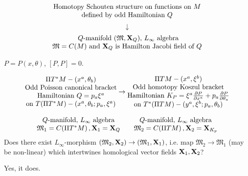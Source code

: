 \documentclass{beamer}
\def\p{\partial}
\def\M {{\mathfrak M}}
\def\p {\partial}
\def \X   {{\bf X}}
\begin{document}
\begin{frame}
           $$
          \begin{matrix}
\hbox
 {Homotopy Schouten structure on functions on $M$}\cr
       \hbox{defined by odd Hamiltonian $Q$}\cr
          \end{matrix}
          $$
          $$
         \downarrow
          $$
         $$
       \begin{matrix}
  \hbox{ $Q$-manifold $(\M, \X_Q)$, $L_\infty$ algebra}\cr
 \hbox{$\M=C(M)$ and $\X_Q$ is Hamilton Jacobi field of $Q$}\cr
       \end{matrix}
         $$



\end{frame}
\begin{frame}

\centerline {$P=P(x,\theta)$, $[P,P]=0$.}

                 $$
              \begin{matrix}
                     \Pi T^*M-(x^a,\theta_b)\cr
 \hbox {Odd Poisson canonical bracket}\cr
   \hbox {Hamiltonian $Q=p_a\xi^a$}\cr
        \hbox{on $T(\Pi T^*M)-(x^a,\theta_b; p_a,\xi ^a)$}
                \end{matrix}
                      \rightarrow
                     \begin{matrix}
                     \Pi TM-(x^a,\xi^b)\cr
    \hbox{Odd homotopy Koszul bracket}\cr
    \hbox{Hamiltonian $K_P=\xi^a{\p P\over \p x^a}+
         p_a{\p P\over \p \theta_a}$}\cr
\hbox{on $T^*(\Pi TM)-(y^a,\xi^b; p_a,\theta_b)$}   
                \end{matrix}
                 $$

   

      $$
      \begin{matrix}
      \hbox{$Q$-manifold, $L_\infty$ algebra}\cr
  \M_1=C(\Pi T^*M)\,, \X_1=\X_Q\cr
             \end{matrix}
           \qquad
            \begin{matrix}
      \hbox{$Q$-manifold, $L_\infty$ algebra}\cr
      \M_2=C(\Pi TM)\,, \X_2=\X_{K_p}\cr
                 \end{matrix}
         $$
Does there exist $L_\infty$-morphism $(\M_2,\X_2)\to (\M_1,\X_1)$, i.e.
map $\M_2\to \M_1$ (may be non-linear)
which intertwines homological vector fields $\X_1,\X_2$?

\begin{theorem}
   Yes, it does.
\end{theorem}



\end{frame}
\end{document}
